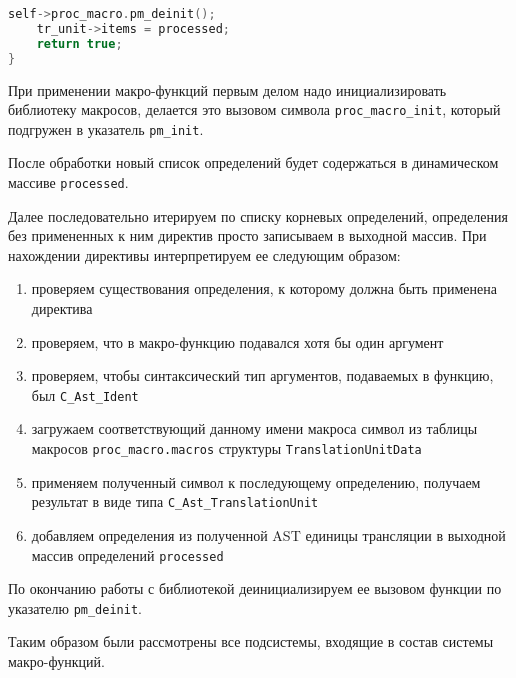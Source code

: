 \begin{lstlisting}[language=c, caption={Реализация функции применения макросов}, label={pass:macros:apply-impl}]
    self->proc_macro.pm_deinit();
    tr_unit->items = processed;
    return true;
}
\end{lstlisting}

При применении макро-функций первым делом надо инициализировать библиотеку макросов, делается это вызовом символа \verb|proc_macro_init|, который подгружен в указатель \verb|pm_init|.

После обработки новый список определений будет содержаться в динамическом массиве \verb|processed|.

Далее последовательно итерируем по списку корневых определений, определения без примененных к ним директив просто записываем в выходной массив.
При нахождении директивы интерпретируем ее следующим образом:
\begin{enumerate}
    \item проверяем существования определения, к которому должна быть применена директива
    \item проверяем, что в макро-функцию подавался хотя бы один аргумент
    \item проверяем, чтобы синтаксический тип аргументов, подаваемых в функцию, был \verb|C_Ast_Ident|
    \item загружаем соответствующий данному имени макроса символ из таблицы макросов \verb|proc_macro.macros| структуры \verb|TranslationUnitData|
    \item применяем полученный символ к последующему определению, получаем результат в виде типа \verb|C_Ast_TranslationUnit|
    \item добавляем определения из полученной AST единицы трансляции в выходной массив определений \verb|processed|
\end{enumerate}


По окончанию работы с библиотекой деинициализируем ее вызовом функции по указателю \verb|pm_deinit|.

Таким образом были рассмотрены все подсистемы, входящие в состав системы макро-функций.